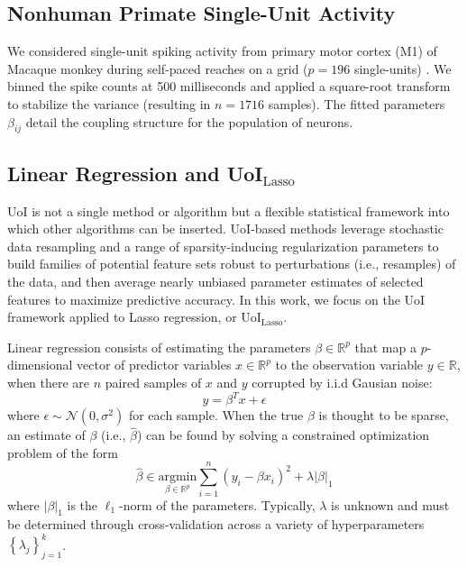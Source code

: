 \documentclass[letterpaper, 10 pt, conference]{ieeeconf}  %
\begin{document}
\subsection{Nonhuman Primate Single-Unit Activity}
We considered single-unit spiking activity from primary motor cortex (M1) of Macaque monkey during self-paced reaches on a grid ($p=196$ single-units) \cite{nhp}. We binned the spike counts at 500 milliseconds and applied a square-root transform to stabilize the variance (resulting in $n=1716$ samples). The fitted parameters $\beta_{ij}$ detail the coupling structure for the population of neurons.

\subsection{Linear Regression and UoI$_{\text{Lasso}}$}
UoI is not a single method or algorithm but a flexible statistical framework into which other algorithms can be inserted. UoI-based methods leverage stochastic data resampling and a range of sparsity-inducing regularization parameters to build families of potential feature sets robust to perturbations (i.e., resamples) of the data, and then average nearly unbiased parameter estimates of selected features to maximize predictive accuracy. In this work, we focus on the UoI framework applied to Lasso regression, or UoI$_{\text{Lasso}}$.

Linear regression consists of estimating the parameters $\beta \in \mathbb{R}^p$ that map a $p$-dimensional vector of predictor variables $x \in \mathbb{R}^p$ to the observation variable $y\in \mathbb{R}$, when there are $n$ paired samples of $x$ and $y$ corrupted by i.i.d Gausian noise:
$$
y = \beta^T x + \epsilon
$$
where $\epsilon \sim \mathcal{N}(0, \sigma^2)$ for each sample. When the true $\beta$ is thought to be sparse, an estimate of $\beta$ (i.e., $\hat{\beta}$) can be found by solving a constrained optimization problem of the form
$$
\hat{\beta} \in \underset{\beta\in \mathbb{R}^p}{\text{argmin}} \sum_{i=1}^n(y_i - \beta x_i)^2 + \lambda |\beta|_1
$$
where $|\beta|_1$ is the $\ell_1$-norm of the parameters. Typically, $\lambda$ is unknown and must be determined through cross-validation across a variety of hyperparameters $\left\{\lambda_j\right\}_{j=1}^k$.
\end{document}
